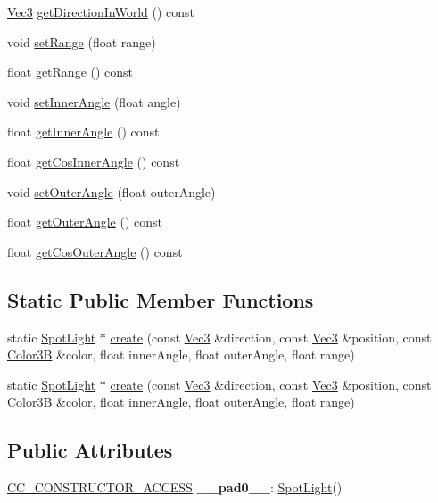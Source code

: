 \begin{DoxyCompactItemize}
\hyperlink{classVec3}{Vec3} \hyperlink{classSpotLight_a23a7a4f9925c546fdbf26f48f07ecd9a}{get\+Direction\+In\+World} () const
\item 
void \hyperlink{classSpotLight_aac5c9c4ac4c8e6d91d2d08c64116402b}{set\+Range} (float range)
\item 
float \hyperlink{classSpotLight_a5309f78c0a001e377947df39b257d31e}{get\+Range} () const
\item 
void \hyperlink{classSpotLight_a392e0d20d0482d33259b70b2dc175f66}{set\+Inner\+Angle} (float angle)
\item 
float \hyperlink{classSpotLight_ab03215482880740310ed24868e544c8d}{get\+Inner\+Angle} () const
\item 
float \hyperlink{classSpotLight_a1546f5ebbf9d082b0aebc56deed6309e}{get\+Cos\+Inner\+Angle} () const
\item 
void \hyperlink{classSpotLight_a46246891e3aa5a6832f10049cb110abd}{set\+Outer\+Angle} (float outer\+Angle)
\item 
float \hyperlink{classSpotLight_a2273fc15dd613144c4b89556d3f7a0f7}{get\+Outer\+Angle} () const
\item 
float \hyperlink{classSpotLight_a8ff2c92bc0ba7b25d962b24f2990b2d2}{get\+Cos\+Outer\+Angle} () const
\end{DoxyCompactItemize}
\subsection*{Static Public Member Functions}
\begin{DoxyCompactItemize}
\item 
static \hyperlink{classSpotLight}{Spot\+Light} $\ast$ \hyperlink{classSpotLight_a147f2e56dd57473d8b51c07a5773d0f1}{create} (const \hyperlink{classVec3}{Vec3} \&direction, const \hyperlink{classVec3}{Vec3} \&position, const \hyperlink{structColor3B}{Color3B} \&color, float inner\+Angle, float outer\+Angle, float range)
\item 
static \hyperlink{classSpotLight}{Spot\+Light} $\ast$ \hyperlink{classSpotLight_aec30f79af73b6ddcbcb54e1edb437a5a}{create} (const \hyperlink{classVec3}{Vec3} \&direction, const \hyperlink{classVec3}{Vec3} \&position, const \hyperlink{structColor3B}{Color3B} \&color, float inner\+Angle, float outer\+Angle, float range)
\end{DoxyCompactItemize}
\subsection*{Public Attributes}
\begin{DoxyCompactItemize}
\item 
\mbox{\label{classSpotLight_af83c75027981ab8d4733bb33f83ed8cd}} 
\hyperlink{_2cocos2d_2cocos_2base_2ccConfig_8h_a25ef1314f97c35a2ed3d029b0ead6da0}{C\+C\+\_\+\+C\+O\+N\+S\+T\+R\+U\+C\+T\+O\+R\+\_\+\+A\+C\+C\+E\+SS} {\bfseries \+\_\+\+\_\+pad0\+\_\+\+\_\+}\+: \hyperlink{classSpotLight}{Spot\+Light}()
\end{DoxyCompactItemize}
